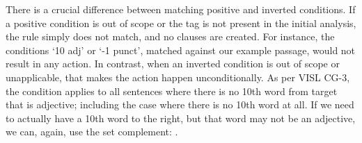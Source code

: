 There is a crucial difference between matching positive and inverted conditions.
If a positive condition is out of scope or the tag is not present in the initial analysis, the rule simply does not match, and no clauses are created. For instance, the conditions `10 adj' or `-1 punct', matched against our example passage, would not result in any action.
In contrast, when an inverted condition is out of scope or unapplicable, 
that makes the action happen unconditionally.
As per VISL CG-3, the condition  applies to all sentences where there is no 10th word from target that is adjective; including the case where there is no 10th word at all.
If we need to actually have a 10th word to the right, but that word may not be an adjective, we can, again, use the set complement: .





